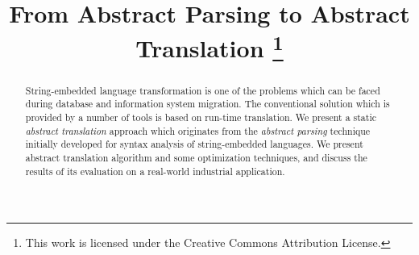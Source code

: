 \documentclass[conference]{IEEEtran}
\begin{document}
\sloppy
\IEEEoverridecommandlockouts
%
\title{From Abstract Parsing to Abstract Translation {\thanks{This work is licensed under the Creative Commons Attribution License.}}}

\author{
\and
{}
}

\maketitle

\begin{abstract}
String-embedded language transformation is one of the problems which can be faced during 
database and information system migration. The conventional solution which
is provided by a number of tools is based on run-time translation. We present a static 
\emph{abstract translation} approach which originates from the \emph{abstract parsing} 
technique~\cite{AbstrParsing} initially developed for syntax analysis of string-embedded 
languages. We present abstract translation algorithm and some optimization techniques, and
discuss the results of its evaluation on a real-world industrial application.

\end{abstract}

\IEEEpeerreviewmaketitle








\end{document}
